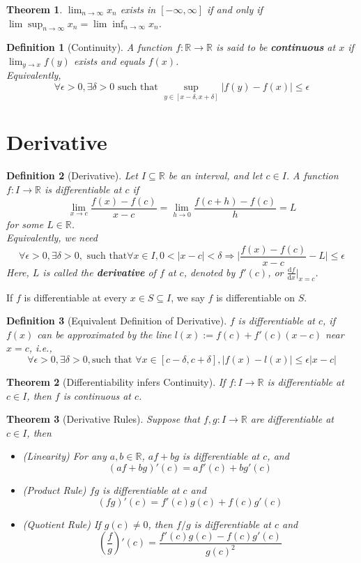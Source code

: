 \documentclass[12pt]{article}
\newcommand{\diff}{\mathrm{d}}
\newtheorem{definition}{Definition}[section]
\newtheorem{theorem}{Theorem}[section]
\theoremstyle{definition}
\begin{document}
\begin{theorem}
\normalfont $\lim_{n\to\infty} x_n$ exists in $[-\infty,\infty]$ if and only if $\lim\sup_{n\to\infty} x_n = \lim\inf_{n\to\infty} x_n$.
\end{theorem}
\begin{definition}[Continuity]
\normalfont A function $f:\mathbb{R}\to\mathbb{R}$ is said to be \textbf{continuous} at $x$ if $\lim_{y\to x} f(y)$ exists and equals $f(x)$.\\
Equivalently,
\[
\forall \epsilon>0, \exists \delta>0\text{ such that } \sup_{y\in[x-\delta, x+\delta]}|f(y)-f(x)|\leq \epsilon
\]
\end{definition}
\section{Derivative}
\begin{definition}[Derivative]
\normalfont Let $I\subseteq \mathbb{R}$ be an interval, and let $c\in I$. A function $f:I\to \mathbb{R}$ is differentiable at $c$ if
\[
\lim_{x\to c}\frac{f(x)-f(c)}{x-c} = \lim_{h\to 0}\frac{f(c+h)-f(c)}{h} = L
\]
for some $L\in \mathbb{R}$.\\
Equivalently, we need
\[
\forall \epsilon>0, \exists\delta>0,\text{ such that} \forall x\in I, 0<|x-c|<\delta \Rightarrow \lvert \frac{f(x)-f(c)}{x-c}-L\rvert \leq \epsilon
\]
Here, $L$ is called the \textbf{derivative} of $f$ at $c$, denoted by $f'(c)$, or $\frac{\diff f}{\diff x}\rvert_{x=c}$.
\end{definition}
If $f$ is differentiable at every $x\in S\subseteq I$, we say $f$ is differentiable on $S$.
\begin{definition}[Equivalent Definition of Derivative]
\normalfont $f$ is differentiable at $c$, if $f(x)$ can be approximated by the line $l(x):=f(c)+f'(c)(x-c)$ near $x=c$, i.e., 
\[
\forall \epsilon>0, \exists \delta>0, \text{such that } \forall x\in[c-\delta, c+\delta], |f(x)-l(x)|\leq \epsilon|x-c| 
\] 
\end{definition}
\begin{theorem}[Differentiability infers Continuity]
\normalfont If $f:I\to \mathbb{R}$ is differentiable at $c\in I$, then $f$ is continuous at $c$.
\end{theorem}
\begin{theorem}[Derivative Rules]
\normalfont Suppose that $f,g: I\to\mathbb{R}$ are differentiable at $c\in I$, then
\begin{itemize}
	\item (Linearity) For any $a,b\in\mathbb{R}$, $af+bg$ is differentiable at $c$, and
	\[
(af+bg)'(c) = af'(c)+bg'(c)
	\]
	\item (Product Rule) $fg$ is differentiable at $c$ and
	\[
(fg)'(c) = f'(c)g(c)+f(c)g'(c)
	\]
	\item (Quotient Rule) If $g(c)\neq 0$, then $f/g$ is differentiable at $c$ and
	\[
(\frac{f}{g})'(c) = \frac{f'(c)g(c)-f(c)g'(c)}{g(c)^2}
	\]
\end{itemize}
\end{theorem}
\end{document}
